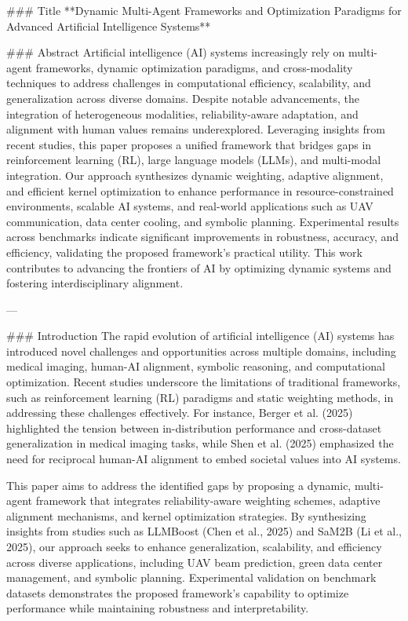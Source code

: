 ### Title
**Dynamic Multi-Agent Frameworks and Optimization Paradigms for Advanced Artificial Intelligence Systems**

### Abstract
Artificial intelligence (AI) systems increasingly rely on multi-agent frameworks, dynamic optimization paradigms, and cross-modality techniques to address challenges in computational efficiency, scalability, and generalization across diverse domains. Despite notable advancements, the integration of heterogeneous modalities, reliability-aware adaptation, and alignment with human values remains underexplored. Leveraging insights from recent studies, this paper proposes a unified framework that bridges gaps in reinforcement learning (RL), large language models (LLMs), and multi-modal integration. Our approach synthesizes dynamic weighting, adaptive alignment, and efficient kernel optimization to enhance performance in resource-constrained environments, scalable AI systems, and real-world applications such as UAV communication, data center cooling, and symbolic planning. Experimental results across benchmarks indicate significant improvements in robustness, accuracy, and efficiency, validating the proposed framework's practical utility. This work contributes to advancing the frontiers of AI by optimizing dynamic systems and fostering interdisciplinary alignment.

---

### Introduction
The rapid evolution of artificial intelligence (AI) systems has introduced novel challenges and opportunities across multiple domains, including medical imaging, human-AI alignment, symbolic reasoning, and computational optimization. Recent studies underscore the limitations of traditional frameworks, such as reinforcement learning (RL) paradigms and static weighting methods, in addressing these challenges effectively. For instance, Berger et al. (2025) highlighted the tension between in-distribution performance and cross-dataset generalization in medical imaging tasks, while Shen et al. (2025) emphasized the need for reciprocal human-AI alignment to embed societal values into AI systems.

This paper aims to address the identified gaps by proposing a dynamic, multi-agent framework that integrates reliability-aware weighting schemes, adaptive alignment mechanisms, and kernel optimization strategies. By synthesizing insights from studies such as LLMBoost (Chen et al., 2025) and SaM2B (Li et al., 2025), our approach seeks to enhance generalization, scalability, and efficiency across diverse applications, including UAV beam prediction, green data center management, and symbolic planning. Experimental validation on benchmark datasets demonstrates the proposed framework's capability to optimize performance while maintaining robustness and interpretability.


